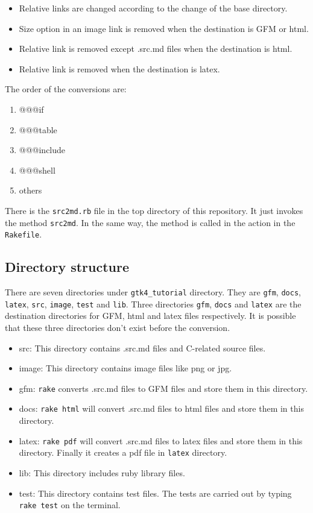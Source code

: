 \begin{itemize}
\tightlist
\item
  Relative links are changed according to the change of the base
  directory.
\item
  Size option in an image link is removed when the destination is GFM or
  html.
\item
  Relative link is removed except .src.md files when the destination is
  html.
\item
  Relative link is removed when the destination is latex.
\end{itemize}

The order of the conversions are:

\begin{enumerate}
\def\labelenumi{\arabic{enumi}.}
\tightlist
\item
  @@@if
\item
  @@@table
\item
  @@@include
\item
  @@@shell
\item
  others
\end{enumerate}

There is the \texttt{src2md.rb} file in the top directory of this
repository. It just invokes the method \texttt{src2md}. In the same way,
the method is called in the action in the \texttt{Rakefile}.

\subsection{Directory structure}\label{directory-structure}

There are seven directories under \texttt{gtk4\_tutorial} directory.
They are \texttt{gfm}, \texttt{docs}, \texttt{latex}, \texttt{src},
\texttt{image}, \texttt{test} and \texttt{lib}. Three directories
\texttt{gfm}, \texttt{docs} and \texttt{latex} are the destination
directories for GFM, html and latex files respectively. It is possible
that these three directories don't exist before the conversion.

\begin{itemize}
\tightlist
\item
  src: This directory contains .src.md files and C-related source files.
\item
  image: This directory contains image files like png or jpg.
\item
  gfm: \texttt{rake} converts .src.md files to GFM files and store them
  in this directory.
\item
  docs: \texttt{rake\ html} will convert .src.md files to html files and
  store them in this directory.
\item
  latex: \texttt{rake\ pdf} will convert .src.md files to latex files
  and store them in this directory. Finally it creates a pdf file in
  \texttt{latex} directory.
\item
  lib: This directory includes ruby library files.
\item
  test: This directory contains test files. The tests are carried out by
  typing \texttt{rake\ test} on the terminal.
\end{itemize}

